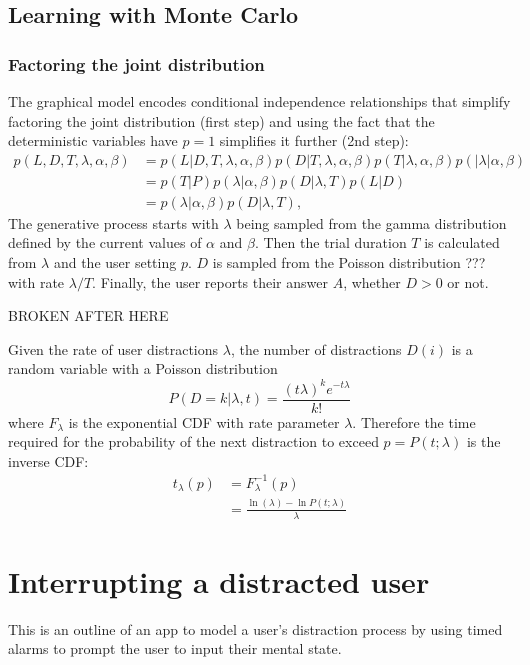 \documentclass{article}
\begin{document}
\subsection{Learning with Monte Carlo}



\subsubsection{Factoring the joint distribution}
The graphical model encodes conditional independence relationships that simplify factoring the joint distribution (first step) and using the fact that the deterministic variables have $p=1$ simplifies it further (2nd step):
\begin{align}
p(L, D, T, \lambda, \alpha, \beta) &= p(L| D, T, \lambda, \alpha, \beta)p(D| T, \lambda, \alpha, \beta)p(T| \lambda, \alpha, \beta)p(| \lambda| \alpha, \beta) \nonumber\\
&= p(T|P)p(\lambda|\alpha, \beta)p(D|\lambda, T)p(L|D)\nonumber\\
&=p(\lambda|\alpha, \beta)p(D|\lambda, T)\label{joint},
\end{align}
The generative process starts with $\lambda$ being sampled from the gamma distribution defined by the current values of $\alpha$ and $\beta$. Then the trial duration $T$ is calculated from $\lambda$ and the user setting $p$. $D$ is sampled from the Poisson distribution ??? with rate $\lambda/T$. Finally, the user reports their answer $A$, whether $D>0$ or not.



BROKEN AFTER HERE



Given the rate of user distractions $\lambda$, the number of distractions $D(i)$ is a random variable with a Poisson distribution
\begin{equation}
  P(D=k|\lambda,t) = \frac{ (t\lambda)^k e^{-t\lambda}}{k!}%
\end{equation}
where $F_\lambda$ is the exponential CDF with rate parameter $\lambda$.  Therefore the time required for the probability of the next distraction to exceed $p=P(t;\lambda)$ is the inverse CDF:
\begin{align}
  t_\lambda(p)& = F_\lambda^{-1}(p)\nonumber\\
  & = \frac{\ln(\lambda) -\ln P(t;\lambda) }{\lambda}\label{inv_dist}
\end{align}


\section{Interrupting a distracted user}
This is an outline of an app to model a user's distraction process by using timed alarms to prompt the user to input their mental state.
\end{document}
